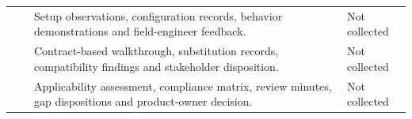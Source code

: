\begin{tabularx}{\linewidth}{L{2.6cm}L{2.7cm}YL{2.1cm}}
\label{PlannedEvidence:VAL-006} &  & Setup observations, configuration records, behavior demonstrations and field-engineer feedback. & Not collected\\
\label{PlannedEvidence:VAL-007} &  & Contract-based walkthrough, substitution records, compatibility findings and stakeholder disposition. & Not collected\\
\label{PlannedEvidence:VAL-008} &  & Applicability assessment, compliance matrix, review minutes, gap dispositions and product-owner decision. & Not collected\\
\end{tabularx}
